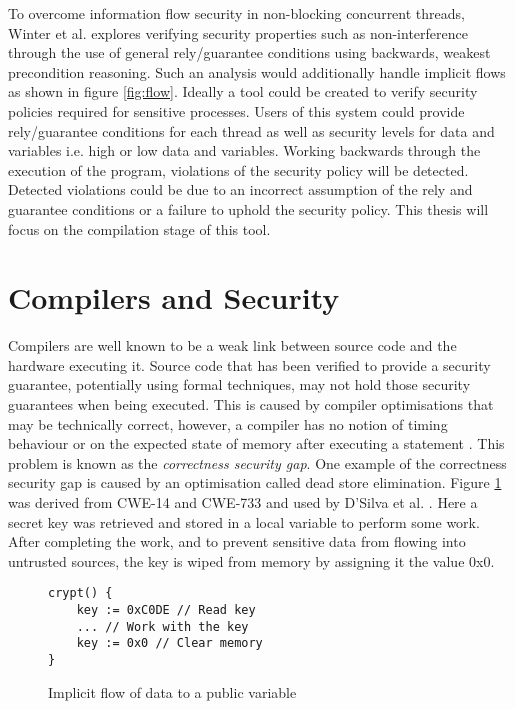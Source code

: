 To overcome information flow security in non-blocking concurrent threads, Winter et al. \cite{winter2020information} explores verifying security properties such as non-interference through the use of general rely/guarantee conditions using backwards, weakest precondition reasoning. Such an analysis would additionally handle implicit flows as shown in figure \ref{fig:flow}. Ideally a tool could be created to verify security policies required for sensitive processes. Users of this system could provide rely/guarantee conditions for each thread as well as security levels for data and variables i.e. high or low data and variables. Working backwards through the execution of the program, violations of the security policy will be detected. Detected violations could be due to an incorrect assumption of the rely and guarantee conditions or a failure to uphold the security policy. This thesis will focus on the compilation stage of this tool.

\section{Compilers and Security}
\label{sec:compilersSecurity}
Compilers are well known to be a weak link between source code and the hardware executing it. Source code that has been verified to provide a security guarantee, potentially using formal techniques, may not hold those security guarantees when being executed. This is caused by compiler optimisations that may be technically correct, however, a compiler has no notion of timing behaviour or on the expected state of memory after executing a statement \cite{d2015correctness}. This problem is known as the \textit{correctness security gap}. One example of the correctness security gap is caused by an optimisation called dead store elimination. Figure \ref{fig:deadstore} was derived from CWE-14 \cite{cwe14} and CWE-733 \cite{cwe733} and used by D'Silva et al. \cite{d2015correctness}. Here a secret key was retrieved and stored in a local variable to perform some work. After completing the work, and to prevent sensitive data from flowing into untrusted sources, the key is wiped from memory by assigning it the value 0x0.

\begin{figure}
    \begin{lstlisting}
crypt() {
    key := 0xC0DE // Read key
    ... // Work with the key
    key := 0x0 // Clear memory
}
    \end{lstlisting}
    \caption{Implicit flow of data to a public variable \cite{d2015correctness}}
    \label{fig:deadstore}
\end{figure}

